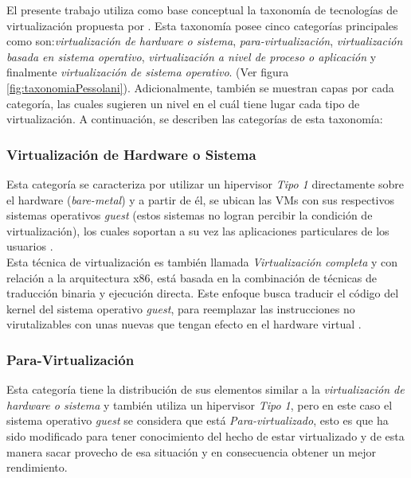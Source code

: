 
El presente trabajo utiliza como base conceptual la taxonomía de tecnologías de virtualización propuesta por \textcite{Pessolani2012}. Esta taxonomía posee cinco categorías principales como son:\textit{virtualización de hardware o sistema}, \textit{para-virtualización}, \textit{virtualización basada en sistema operativo}, \textit{virtualización a nivel de proceso o aplicación} y finalmente \textit{virtualización de sistema operativo}. (Ver figura \ref{fig:taxonomiaPessolani}). Adicionalmente, también se muestran capas por cada categoría, las cuales sugieren un nivel en el cuál tiene lugar cada tipo de virtualización. A continuación, se describen las categorías de esta taxonomía:\\


\subsubsection{Virtualización de Hardware o Sistema}
\vspace{5mm}
Esta categoría se caracteriza por utilizar un hipervisor \textit{Tipo 1} directamente sobre el hardware (\textit{bare-metal}) y a partir de él, se ubican las VMs con sus respectivos sistemas operativos \textit{guest} (estos sistemas no logran percibir la condición de virtualización), los cuales soportan a su vez las aplicaciones particulares de los usuarios \parencite{Pessolani2012}.\\

Esta técnica de virtualización es también llamada \textit{Virtualización completa} y con relación a la arquitectura x86, está basada en la combinación de técnicas de traducción binaria y ejecución directa. Este enfoque busca traducir el código del kernel del sistema operativo \textit{guest}, para reemplazar las instrucciones no virutalizables con unas nuevas que tengan efecto en el hardware virtual \parencite{VMware2008}. 

\subsubsection{Para-Virtualización}
\vspace{5mm}

Esta categoría tiene la distribución de sus elementos similar a la \textit{virtualización de hardware o sistema} y también utiliza un hipervisor \textit{Tipo 1}, pero en este caso el sistema operativo \textit{guest} se considera que está \textit{Para-virtualizado}, esto es que ha sido modificado para tener conocimiento del hecho de estar virtualizado y de esta manera sacar provecho de esa situación y en consecuencia obtener un mejor rendimiento. \parencite{Pessolani2012}\\

